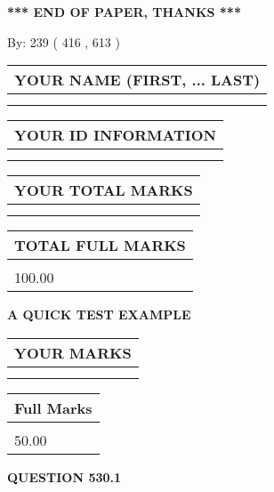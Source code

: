 \documentclass[12pt]{article}
\begin{document}
\vspace{1.0in} 
{\textbf{\large{ *** END OF PAPER, THANKS *** }}} 
   
   
\hspace{1.0in} By: 
 239 ( 416 ,  613 )
   
   
   
   
\newpage 
\setcounter{page}{ 
   530001 } 
   
   
   
   
\noindent\begin{tabular}{|l|}
\hline
YOUR NAME (FIRST, ... LAST)  \\
\hline
 \\ 
 \\ 
\hline
\end{tabular}
\hspace{0.05in} \begin{tabular}{|l|}
\hline
 YOUR   ID   INFORMATION  \\
\hline
 \\ 
 \\ 
\hline
\end{tabular}
   
   
\vspace{0.2in}\noindent\begin{tabular}{|l|}
\hline
YOUR TOTAL MARKS  \\
\hline
 \\ 
 \\ 
\hline
\end{tabular}
\hspace{0.05in} \begin{tabular}{|l|}
\hline
TOTAL FULL MARKS  \\
\hline
 \\ 
100.00 \\
\hline
\end{tabular}
   
   
 \vspace{0.2in}
{\LARGE {\textbf{ A QUICK TEST EXAMPLE}}}
   
   
  
\vspace{0.2in}
  
\noindent\begin{tabular}{|l|}
\hline
 YOUR MARKS  \\
\hline
 \\ 
 \\ 
\hline
\end{tabular}
\hspace{0.05in} \begin{tabular}{|l|}
\hline
 Full Marks  \\
\hline
 \\ 
50.00 \\
\hline
\end{tabular}
{\textbf{\Large{QUESTION
530.1 
}}}
  
\end{document}
